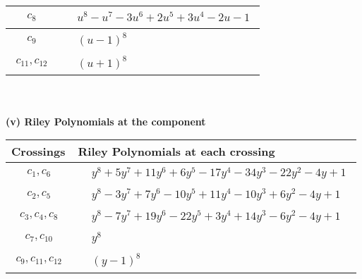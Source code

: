 \documentclass[1p]{elsarticle_modified}
\theoremstyle{definition}
\begin{document}
\begin{tabular}{m{50pt}|m{274pt}}
\hline $$\begin{aligned}c_{8}\end{aligned}$$&$\begin{aligned}
&u^8- u^7-3 u^6+2 u^5+3 u^4-2 u-1
\end{aligned}$\\
\hline $$\begin{aligned}c_{9}\end{aligned}$$&$\begin{aligned}
&(u-1)^8
\end{aligned}$\\
\hline $$\begin{aligned}c_{11},c_{12}\end{aligned}$$&$\begin{aligned}
&(u+1)^8
\end{aligned}$\\
\hline
\end{tabular}\\~\\
\newpage\renewcommand{\arraystretch}{1}
\flushleft \textbf{(v) Riley Polynomials at the component}\newline \\
\begin{tabular}{m{50pt}|m{274pt}}
Crossings & \hspace{64pt}Riley Polynomials at each crossing \\
\hline $$\begin{aligned}c_{1},c_{6}\end{aligned}$$&$\begin{aligned}
&y^8+5 y^7+11 y^6+6 y^5-17 y^4-34 y^3-22 y^2-4 y+1
\end{aligned}$\\
\hline $$\begin{aligned}c_{2},c_{5}\end{aligned}$$&$\begin{aligned}
&y^8-3 y^7+7 y^6-10 y^5+11 y^4-10 y^3+6 y^2-4 y+1
\end{aligned}$\\
\hline $$\begin{aligned}c_{3},c_{4},c_{8}\end{aligned}$$&$\begin{aligned}
&y^8-7 y^7+19 y^6-22 y^5+3 y^4+14 y^3-6 y^2-4 y+1
\end{aligned}$\\
\hline $$\begin{aligned}c_{7},c_{10}\end{aligned}$$&$\begin{aligned}
&y^8
\end{aligned}$\\
\hline $$\begin{aligned}c_{9},c_{11},c_{12}\end{aligned}$$&$\begin{aligned}
&(y-1)^8
\end{aligned}$\\
\hline
\end{tabular}\\~\\
\end{document}
